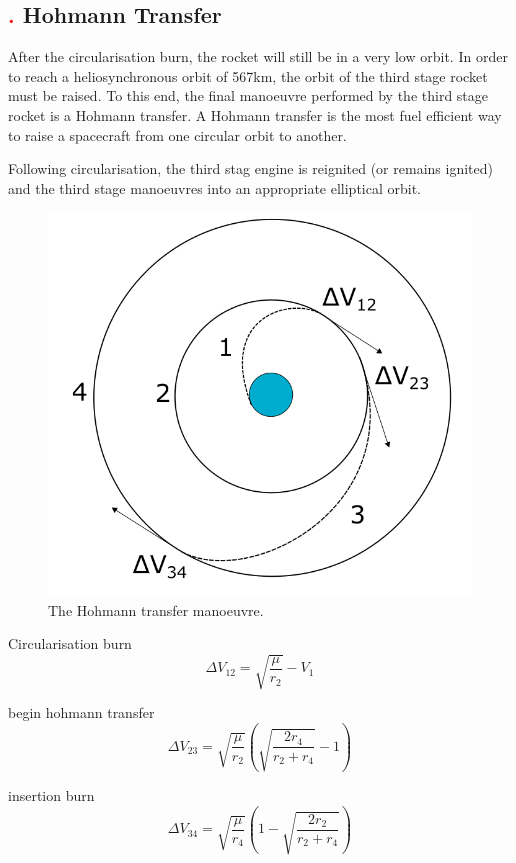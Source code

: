 \subsection{\textcolor{red}{.} Hohmann Transfer}

After the circularisation burn, the rocket will still be in a very low orbit. In order to reach a heliosynchronous orbit of 567km, the orbit of the third stage rocket must be raised. 
To this end, the final manoeuvre performed by the third stage rocket is a Hohmann transfer. A Hohmann transfer is the most fuel efficient way to raise a spacecraft from one circular orbit to another. 

Following circularisation, the third stag engine is reignited (or remains ignited) and the third stage manoeuvres into an appropriate elliptical orbit. 

\begin{figure}
\centering
\includegraphics[width=0.7\linewidth]{figures/4_LODESTAR/Hohmann}
\caption{The Hohmann transfer manoeuvre.}
\label{fig:Hohmann}
\end{figure}




Circularisation burn
\begin{equation}
\Delta V_{12} = \sqrt{\dfrac{\mu}{r_2}} - V_1
\end{equation}

begin hohmann transfer
\begin{equation}
\Delta V_{23} = \sqrt{\dfrac{\mu}{r_2}} \left( \sqrt{\dfrac{2r_4}{r_2 + r_4}} -1 \right)
\end{equation}

insertion burn
\begin{equation}
\Delta V_{34} = \sqrt{\dfrac{\mu}{r_4}} \left(1- \sqrt{\dfrac{2r_2}{r_2 + r_4}}  \right)
\end{equation}


